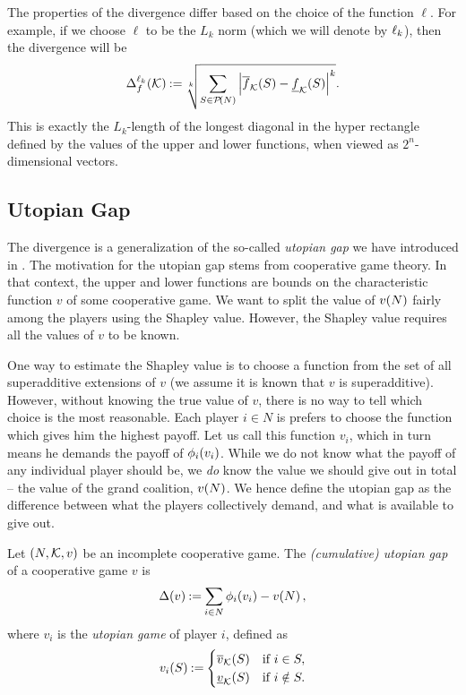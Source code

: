 The properties of the divergence differ based on the choice of the function $ \ell $.
For example, if we choose $ \ell $ to be the $ L_k $ norm (which we will denote by $ \lp k $), then the divergence will be \[
\divg {\lp k} \k \deq \sqrt[k]{\sum_{S \in \pot N}^{} \absolute{ \fce{\uf f}{S} - \fce{\lf f}{S}}^k}.
\]
This is exactly the $ L_k $-length of the longest diagonal in the hyper rectangle defined by the values of the upper and lower functions,
when viewed as $ 2^n $-dimensional vectors.



\subsection{Utopian Gap}

The divergence is a generalization of the so-called \emph{utopian gap} we have introduced in \cite{uradnik2024reducing}.
The motivation for the utopian gap stems from cooperative game theory.
In that context, the upper and lower functions are bounds on the characteristic function $ v $ of some cooperative game.
We want to split the value of $ \fce{v}{N} $ fairly among the players using the Shapley value.
However, the Shapley value requires all the values of $ v $ to be known.

One way to estimate the Shapley value is to choose a function from the set of all superadditive extensions of $ v $ (we assume it is known that $ v $ is superadditive).
However, without knowing the true value of $ v $, there is no way to tell which choice is the most reasonable.
Each player $ i \in N $ is prefers to choose the function which gives him the highest payoff.
Let us call this function $ v_i $, which in turn means he demands the payoff of $ \shapley[i] {v_i} $.
While we do not know what the payoff of any individual player should be, we \emph{do} know the value we should give out in total -- the value of the grand coalition, $ \fce{v}{N} $.
We hence define the utopian gap as the difference between what the players collectively demand, and what is available to give out.

\begin{defi}
  \label{def:gap}
  Let $ \left( N, \k, v \right) $ be an incomplete cooperative game.
  The \emph{(cumulative) utopian gap} of a cooperative game $ v $ is \[
    \gap v \deq \sum_{i \in N} \shapley[i] {v_i} - \fce{v}{N},
  \]
  where $ v_i $ is the \emph{utopian game} of player $ i $, defined as \[
    \fce{v_i}{S} \deq \begin{cases}
      \fce{\uf v}{S} & \text{if } i \in S, \\
      \fce{\lf v}{S} & \text{if } i \notin S.
    \end{cases}
  \]
\end{defi}

